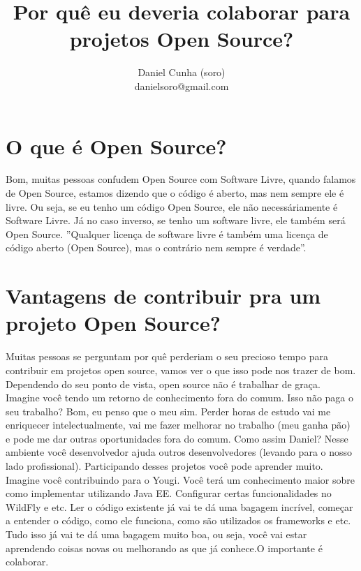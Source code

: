 \documentclass[a4paper,11pt]{article}
\title{Por quê eu deveria colaborar para projetos Open Source?}
\author{Daniel Cunha (soro) \\ danielsoro@gmail.com}
\begin{document}
\maketitle
\newpage
\tableofcontents
\newpage

\section{O que é Open Source?}
Bom, muitas pessoas confudem Open Source com Software Livre, quando falamos de Open Source, estamos dizendo que o código é aberto, mas nem sempre ele é livre. Ou seja, se eu tenho um código Open Source, ele não necessáriamente é Software Livre. Já no caso inverso, se tenho um software livre, ele também será Open Source.\newline\newline
''Qualquer licença de software livre é também uma licença de código aberto (Open Source), mas o contrário nem sempre é verdade''.

\section{Vantagens de contribuir pra um projeto Open Source?}
  Muitas pessoas se perguntam por quê perderiam o seu precioso tempo para contribuir em projetos open source, vamos ver o que isso pode nos trazer de bom.\newline\newline
Dependendo do seu ponto de vista, open source não é trabalhar de graça. Imagine você tendo um retorno de conhecimento fora do comum. Isso não paga o seu trabalho? Bom, eu penso que o meu sim. Perder horas de estudo vai me enriquecer intelectualmente, vai me fazer melhorar no trabalho (meu ganha pão) e pode me dar outras oportunidades fora do comum.\newline\newline
Como assim Daniel?
Nesse ambiente você desenvolvedor ajuda outros desenvolvedores (levando para o nosso lado profissional). Participando desses projetos você pode aprender muito. Imagine você contribuindo para o Yougi. Você terá um conhecimento maior sobre como implementar utilizando Java EE. Configurar certas funcionalidades no WildFly e etc.\newline\newline
Ler o código existente já vai te dá uma bagagem incrível, começar a entender o código, como ele funciona, como são utilizados os frameworks e etc. Tudo isso já vai te dá uma bagagem muito boa, ou seja, você vai estar aprendendo coisas novas ou melhorando as que já conhece.O importante é colaborar.
\end{document}
